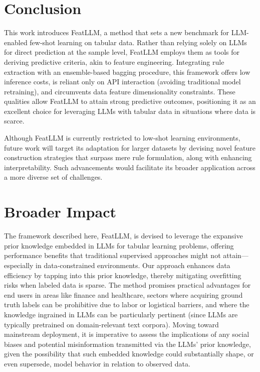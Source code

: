 \section{Conclusion}
This work introduces \textsf{FeatLLM}, a method that sets a new benchmark for LLM-enabled few-shot learning on tabular data. Rather than relying solely on LLMs for direct prediction at the sample level, \textsf{FeatLLM} employs them as tools for deriving predictive criteria, akin to feature engineering. Integrating rule extraction with an ensemble-based bagging procedure, this framework offers low inference costs, is reliant only on API interaction (avoiding traditional model retraining), and circumvents data feature dimensionality constraints. These qualities allow \textsf{FeatLLM} to attain strong predictive outcomes, positioning it as an excellent choice for leveraging LLMs with tabular data in situations where data is scarce.

Although \textsf{FeatLLM} is currently restricted to low-shot learning environments, future work will target its adaptation for larger datasets by devising novel feature construction strategies that surpass mere rule formulation, along with enhancing interpretability. Such advancements would facilitate its broader application across a more diverse set of challenges.

\section{Broader Impact}
The framework described here, \textsf{FeatLLM}, is devised to leverage the expansive prior knowledge embedded in LLMs for tabular learning problems, offering performance benefits that traditional supervised approaches might not attain—especially in data-constrained environments. Our approach enhances data efficiency by tapping into this prior knowledge, thereby mitigating overfitting risks when labeled data is sparse. The method promises practical advantages for end users in areas like finance and healthcare, sectors where acquiring ground truth labels can be prohibitive due to labor or logistical barriers, and where the knowledge ingrained in LLMs can be particularly pertinent (since LLMs are typically pretrained on domain-relevant text corpora). Moving toward mainstream deployment, it is imperative to assess the implications of any social biases and potential misinformation transmitted via the LLMs’ prior knowledge, given the possibility that such embedded knowledge could substantially shape, or even supersede, model behavior in relation to observed data.

